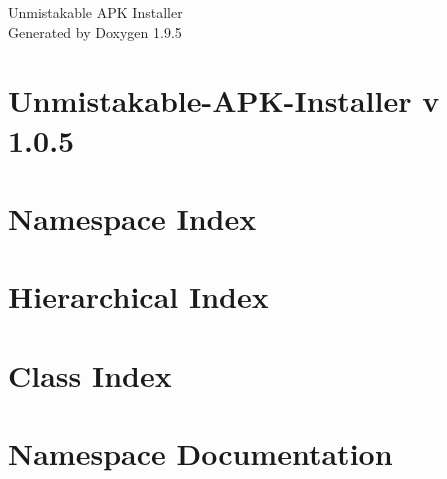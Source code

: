 \documentclass[twoside]{book}
\newcommand{\+}{\discretionary{\mbox{\scriptsize$\hookleftarrow$}}{}{}}
\newcommand{\clearemptydoublepage}{%
    \newpage{\pagestyle{empty}\cleardoublepage}%
  }
\begin{document}
  \raggedbottom
    \hypersetup{pageanchor=false,
                bookmarksnumbered=true,
                pdfencoding=unicode
               }
  \begin{titlepage}
  \vspace*{7cm}
  \begin{center}%
  {\Large Unmistakable APK Installer}\\
  \vspace*{1cm}
  {\large Generated by Doxygen 1.9.5}\\
  \end{center}
  \end{titlepage}
  \clearemptydoublepage
  \tableofcontents
  \clearemptydoublepage
  \hypersetup{pageanchor=true}
\chapter{Unmistakable-\/\+APK-\/\+Installer v 1.0.5}
\label{index}\hypertarget{index}{}
\chapter{Namespace Index}

\chapter{Hierarchical Index}

\chapter{Class Index}

\chapter{Namespace Documentation}














\end{document}
